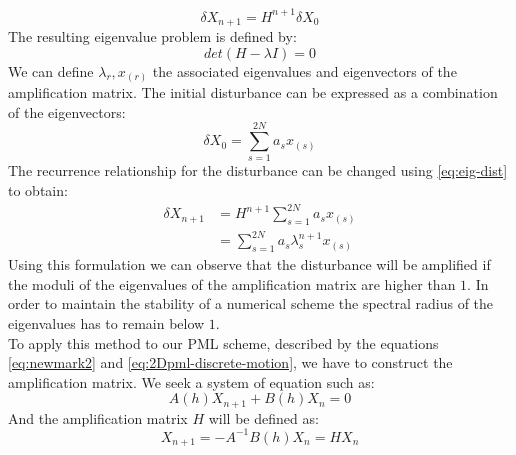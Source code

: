 \begin{equation}
\delta X_{n+1} = H^{n+1} \delta X_0
\end{equation}
The resulting eigenvalue problem is defined by:
\begin{equation}
det(H-\lambda I) = 0
\end{equation}
We can define $\lambda_r, x_{(r)}$ the associated eigenvalues and eigenvectors of the amplification matrix.
The initial disturbance can be expressed as a combination of the eigenvectors:
\begin{equation}
\delta X_0 = \sum^{2N}_{s=1} a_s x_{(s)}
\label{eq:eig-dist}
\end{equation}
The recurrence relationship for the disturbance can be changed using \ref{eq:eig-dist} to obtain:
\begin{align}
\delta X_{n+1} &= H^{n+1} \sum^{2N}_{s=1} a_s x_{(s)} \\
&= \sum^{2N}_{s=1} a_s \lambda_s^{n+1} x_{(s)}
\end{align} 
Using this formulation we can observe that the disturbance will be amplified if the moduli of the eigenvalues of the amplification matrix are higher than $1$. In order to maintain the stability of a numerical scheme the spectral radius of the eigenvalues has to remain below $1$. \\
 
To apply this method to our PML scheme, described by the equations \ref{eq:newmark2} and \ref{eq:2Dpml-discrete-motion}, we have to construct the amplification matrix. We seek a system of equation such as:
\begin{equation}
 A(h) X_{n+1}  + B(h) X_{n} = 0  
\end{equation}
And the amplification matrix $H$ will be defined as:
\begin{equation}
 X_{n+1} = - A^{-1} B(h) X_{n} = H X_{n}  
\end{equation}
